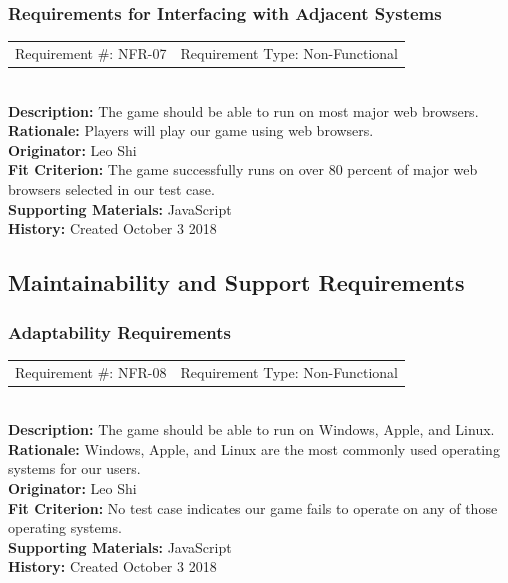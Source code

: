 \documentclass[12pt, titlepage]{article}
\begin{document}
\subsubsection{Requirements for Interfacing with Adjacent Systems}
\begin{reqbox}
	\begin{tabular}{cc}
		Requirement \#: NFR-07 & Requirement Type: Non-Functional \\
	\end{tabular} \\
	\textbf{Description:} The game should be able to run on most major web browsers. \\
	\textbf{Rationale:} Players will play our game using web browsers.\\
	\textbf{Originator:} Leo Shi\\
	\textbf{Fit Criterion:} The game successfully runs on over 80 percent of major web browsers selected in our test case.\\
	\textbf{Supporting Materials:} JavaScript \\
	\textbf{History:} Created October 3 2018
\end{reqbox}

\subsection{Maintainability and Support Requirements}

\subsubsection{Adaptability Requirements}
\begin{reqbox}
	\begin{tabular}{cc}
		Requirement \#: NFR-08 & Requirement Type: Non-Functional \\
	\end{tabular} \\
	\textbf{Description:} The game should be able to run on Windows, Apple, and Linux.\\
	\textbf{Rationale:} Windows, Apple, and Linux are the most commonly used operating systems for our users.\\
	\textbf{Originator:} Leo Shi\\
	\textbf{Fit Criterion:} No test case indicates our game fails to operate on any of those operating systems.\\
	\textbf{Supporting Materials:} JavaScript \\
	\textbf{History:} Created October 3 2018
\end{reqbox}
\end{document}
